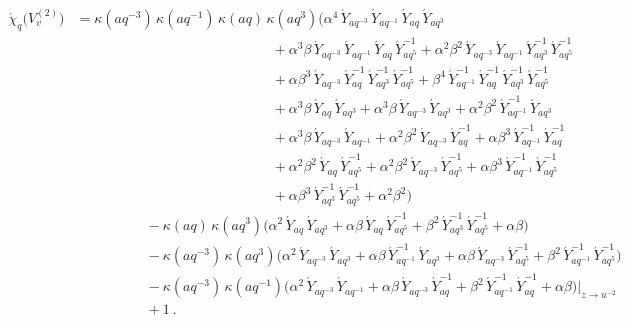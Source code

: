 \documentclass[11pt]{amsart}
\numberwithin{equation}{section}
\numberwithin{equation}{section}
\begin{document}
\begin{appendix}
	{\small 
	\begin{align}
	\acute{\chi}_q\big(V_v^{(2)}\big)
		&= \kappa(aq^{-3})\,\kappa(aq^{-1})\,\kappa(aq)\,\kappa(aq^{3})\Big(
		\alpha^{4}\, {\acute Y}_{aq^{-3}}\,{\acute Y}_{aq^{-1}}\,{\acute Y}_{aq}\,{\acute Y}_{aq^{3}} \nonumber\\
		& \qquad \qquad\qquad\qquad\qquad\qquad\qquad
		+ \alpha^{3}\beta\, {\acute Y}_{aq^{-3}}\,{\acute Y}_{aq^{-1}}\,{\acute Y}_{aq}\,{\acute Y}_{aq^{5}}^{-1}
		+ \alpha^{2}\beta^{2}\, {\acute Y}_{aq^{-3}}\,{\acute Y}_{aq^{-1}}\,{\acute Y}_{aq^{3}}^{-1}\,{\acute Y}_{aq^{5}}^{-1} \nonumber\\
		&\qquad \qquad\qquad\qquad\qquad\qquad\qquad
		+ \alpha\beta^{3}\, {\acute Y}_{aq^{-3}}\,{\acute Y}_{aq}^{-1}\,{\acute Y}_{aq^{3}}^{-1}\,{\acute Y}_{aq^{5}}^{-1}
		+ \beta^{4}\, {\acute Y}_{aq^{-1}}^{-1}\,{\acute Y}_{aq}^{-1}\,{\acute Y}_{aq^{3}}^{-1}\,{\acute Y}_{aq^{5}}^{-1} \nonumber\\
		&\qquad \qquad\qquad\qquad\qquad\qquad\qquad
		+ \alpha^{3}\beta\, {\acute Y}_{aq}\,{\acute Y}_{aq^{3}}
		+ \alpha^{3}\beta\, {\acute Y}_{aq^{-3}}\,{\acute Y}_{aq^{3}}
		+ \alpha^{2}\beta^{2}\, {\acute Y}_{aq^{-1}}^{-1}\,{\acute Y}_{aq^{3}}\nonumber \\
		&\qquad \qquad\qquad\qquad\qquad\qquad\qquad
		+ \alpha^{3}\beta\, {\acute Y}_{aq^{-3}}\,{\acute Y}_{aq^{-1}}
		+ \alpha^{2}\beta^{2}\, {\acute Y}_{aq^{-3}}\,{\acute Y}_{aq}^{-1}
		+ \alpha\beta^{3}\, {\acute Y}_{aq^{-1}}^{-1}\,{\acute Y}_{aq}^{-1} \nonumber\\
		&\qquad \qquad\qquad\qquad\qquad\qquad\qquad
		+ \alpha^{2}\beta^{2}\, {\acute Y}_{aq}\,{\acute Y}_{aq^{5}}^{-1}
		+ \alpha^{2}\beta^{2}\, {\acute Y}_{aq^{-3}}\,{\acute Y}_{aq^{5}}^{-1}
		+ \alpha\beta^{3}\, {\acute Y}_{aq^{-1}}^{-1}\,{\acute Y}_{aq^{5}}^{-1} \nonumber\\
		&\qquad \qquad\qquad\qquad\qquad\qquad\qquad
		+ \alpha\beta^{3}\, {\acute Y}_{aq^{3}}^{-1}\,{\acute Y}_{aq^{5}}^{-1}
		+ \alpha^{2}\beta^{2}
		\Big) \nonumber\\
		&\qquad \qquad\quad
		- \kappa(aq)\,\kappa(aq^{3})\Big(
		\alpha^{2}\, {\acute Y}_{aq}\,{\acute Y}_{aq^{3}}
		+ \alpha\beta\, {\acute Y}_{aq}\,{\acute Y}_{aq^{5}}^{-1}
		+ \beta^{2}\, {\acute Y}_{aq^{3}}^{-1}\,{\acute Y}_{aq^{5}}^{-1}
		+ \alpha\beta
		\Big) \label{eq:chi2}\\
		&\qquad \qquad\quad
		- \kappa(aq^{-3})\,\kappa(aq^{3})\Big(
		\alpha^{2}\, {\acute Y}_{aq^{-3}}\,{\acute Y}_{aq^{3}}
		+ \alpha\beta\, {\acute Y}_{aq^{-1}}^{-1}\,{\acute Y}_{aq^{3}}
		+ \alpha\beta\, {\acute Y}_{aq^{-3}}\,{\acute Y}_{aq^{5}}^{-1} + \beta^{2}\, {\acute Y}_{aq^{-1}}^{-1}\,{\acute Y}_{aq^{5}}^{-1}
		\Big)\nonumber\\
		&\qquad\qquad\quad
		- \kappa(aq^{-3})\,\kappa(aq^{-1})\Big(
		\alpha^{2}\, {\acute Y}_{aq^{-3}}\,{\acute Y}_{aq^{-1}}
		+ \alpha\beta\, {\acute Y}_{aq^{-3}}\,{\acute Y}_{aq}^{-1}
		+ \beta^{2}\, {\acute Y}_{aq^{-1}}^{-1}\,{\acute Y}_{aq}^{-1}
		+ \alpha\beta
		\Big)\Bigg|_{z\rightarrow u^{-2}} \nonumber\\
		&\qquad \qquad\quad+ 1 \ .\nonumber
	\end{align}
}
\normalsize




\end{appendix}
\end{document}

